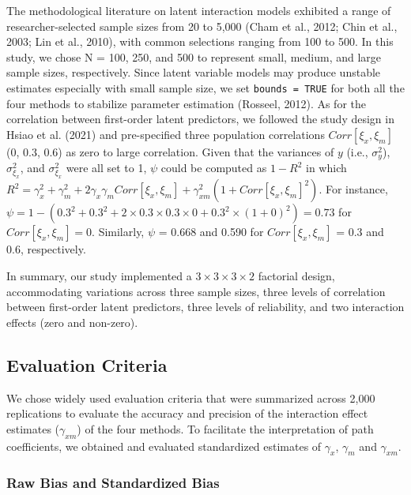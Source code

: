 \documentclass[
  man]{apa6}
\begin{document}
The methodological literature on latent interaction models exhibited a range of researcher-selected sample sizes from 20 to 5,000 (Cham et al., 2012; Chin et al., 2003; Lin et al., 2010), with common selections ranging from 100 to 500. In this study, we chose N = 100, 250, and 500 to represent small, medium, and large sample sizes, respectively. Since latent variable models may produce unstable estimates especially with small sample size, we set \texttt{bounds\ =\ TRUE} for both all the four methods to stabilize parameter estimation (Rosseel, 2012).
As for the correlation between first-order latent predictors, we followed the study design in Hsiao et al. (2021) and pre-specified three population correlations \(Corr[{\xi_{x},\xi_{m}}]\) (0, 0.3, 0.6) as zero to large correlation. Given that the variances of \(y\) (i.e., \(\sigma_{y}^2\)), \(\sigma_{\xi_{x}}^2\), and \(\sigma_{\xi_{x}}^2\) were all set to 1, \(\psi\) could be computed as \(1 - R^2\) in which \(R^2 = \gamma_{x}^2 + \gamma_{m}^2 + 2\gamma_{x}\gamma_{m}Corr[{\xi_{x},\xi_{m}}] + \gamma_{xm}^2(1 + Corr[{\xi_{x},\xi_{m}}]^2)\). For instance, \(\psi = 1 - (0.3^2 + 0.3^2 + 2\times0.3\times0.3\times0 + 0.3^2\times(1 + 0)^2) = 0.73\) for \(Corr[{\xi_{x},\xi_{m}}] = 0\). Similarly, \(\psi\) = 0.668 and 0.590 for \(Corr[{\xi_{x},\xi_{m}}]\) = 0.3 and 0.6, respectively.

In summary, our study implemented a \(3 \times 3 \times 3 \times 2\) factorial design, accommodating variations across three sample sizes, three levels of correlation between first-order latent predictors, three levels of reliability, and two interaction effects (zero and non-zero).

\subsection{Evaluation Criteria}\label{evaluation-criteria}

We chose widely used evaluation criteria that were summarized across 2,000 replications to evaluate the accuracy and precision of the interaction effect estimates (\(\gamma_{xm}\)) of the four methods. To facilitate the interpretation of path coefficients, we obtained and evaluated standardized estimates of \(\gamma_{x}\), \(\gamma_{m}\) and \(\gamma_{xm}\).

\subsubsection{Raw Bias and Standardized Bias}\label{raw-bias-and-standardized-bias}
\end{document}
